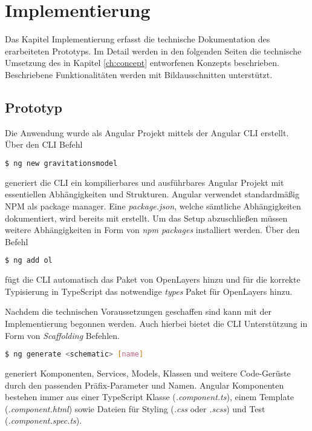 \chapter{Implementierung}
Das Kapitel Implementierung erfasst die technische Dokumentation des erarbeiteten Prototyps.
Im Detail werden in den folgenden Seiten die technische Umsetzung des in Kapitel \ref{ch:concept} entworfenen Konzepts beschrieben. 
Beschriebene Funktionalitäten werden mit Bildausschnitten unterstützt.

\section{Prototyp}
Die Anwendung wurde als Angular Projekt mittels der Angular CLI erstellt. 
Über den CLI Befehl 

\begin{lstlisting}[language=bash]
$ ng new gravitationsmodel
\end{lstlisting}

generiert die CLI ein kompilierbares und ausführbares Angular Projekt mit essentiellen Abhängigkeiten und Strukturen.
Angular verwendet standardmäßig NPM als package manager.
Eine \emph{package.json}, welche sämtliche Abhängigkeiten dokumentiert, wird bereits mit erstellt.
Um das Setup abzuschließen müssen weitere Abhängigkeiten in Form von \emph{npm packages} installiert werden.
Über den Befehl 

\begin{lstlisting}[language=bash]
$ ng add ol
\end{lstlisting}

fügt die CLI automatisch das Paket von OpenLayers hinzu und für die korrekte Typisierung in TypeScript das notwendige \emph{types} Paket für OpenLayers hinzu.

Nachdem die technischen Voraussetzungen geschaffen sind kann mit der Implementierung begonnen werden.
Auch hierbei bietet die CLI Unterstützung in Form von \emph{Scaffolding} Befehlen.

\begin{lstlisting}[language=bash]
$ ng generate <schematic> [name]
\end{lstlisting}

generiert Komponenten, Services, Models, Klassen und weitere Code-Gerüste durch den passenden Präfix-Parameter und Namen.
Angular Komponenten bestehen immer aus einer TypeScript Klasse (\emph{.component.ts}), einem Template (\emph{.component.html}) sowie Dateien für Styling (\emph{.css} oder \emph{.scss}) und Test (\emph{.component.spec.ts}).

